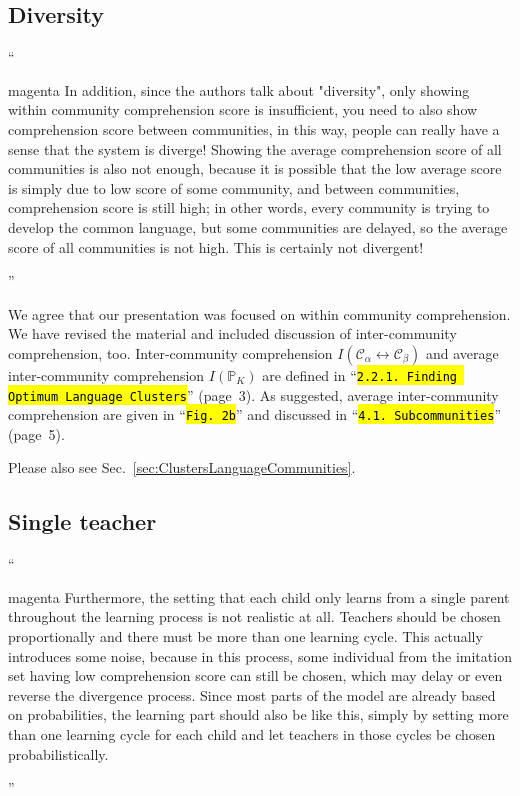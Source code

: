 \documentclass[10.5pt]{amsart}
\newcommand{\refsec}[1]{Sec.~\ref{#1}}
\newcommand{\hbColorReviewer}{magenta}
\newcommand{\hbColorManuscript}{violet}
\newenvironment{hbReviewer}
	{\list{}{\leftmargin=2cm\rightmargin=1cm}\item[]``\begin{footnotesize}
	\begin{color}{\hbColorReviewer}}	
	{\end{color}\end{footnotesize}''\endlist}
\newcommand{\hbMRef}[1]{``\texttt{{\color{\hbColorManuscript}\hl{#1}}}''}
\newcommand{\hbMRefP}[2]{``\texttt{{\color{\hbColorManuscript}\hl{#1}}}''  (page~#2)}
\newcommand{\hbMreffig}[1]{\hbMRef{Fig.~#1}}
\newcommand{\hbMOptimumLanguageClusters}{\hbMRefP{2.2.1. Finding Optimum Language Clusters}{3}}
\newcommand{\hbMSubcommunities}{\hbMRefP{4.1. Subcommunities}{5}}
\newcommand{\hbSet}[1]{\mathcal{#1}}
\newcommand{\hbIntCLS}[2]{I(#1 \leftrightarrow #2)}
\newcommand{\hbPartition}[1]{\mathbb{#1}} %
\begin{document}
\subsection{Diversity}
\label{sec:diversity}
\begin{hbReviewer}
	In addition, since the authors talk about "diversity", 
	only showing within community comprehension score is insufficient, 
	you need to also show comprehension score between communities, 
	in this way, people can really have a sense that the system is diverge! 
	Showing the average comprehension score of all communities is also 
	not enough, 
	because it is possible that the low average score is simply 
	due to low score of some community, 
	and between communities, comprehension score is still high; 
	in other words, every community is trying to develop the common language, 
	but some communities are delayed, 
	so the average score of all communities is not high. 
	This is certainly not divergent! 
\end{hbReviewer}

We agree that our presentation was focused on within community comprehension.
We have revised the material and 
included discussion of inter-community comprehension, too.
Inter-community comprehension 
$\hbIntCLS{\hbSet{C}_{\alpha}}{\hbSet{C}_{\beta}}$ 
and 
average inter-community comprehension 
$I({\hbPartition{P}_{K}})$
are defined in \hbMOptimumLanguageClusters.
As suggested, 
average inter-community comprehension are given in \hbMreffig{2b} and discussed in \hbMSubcommunities.

Please also see \refsec{sec:ClustersLanguageCommunities}.






\subsection{Single teacher}
\label{sec:singleTeacher}
\begin{hbReviewer}
	Furthermore, the setting that each child only learns from a single parent 
	throughout the learning process is not realistic at all. 
	Teachers should be chosen proportionally 
	and there must be more than one learning cycle. 
	This actually introduces some noise, 
	because in this process, some individual from the imitation set 
	having low comprehension score can still be chosen, 
	which may delay or even reverse the divergence process. 
	Since most parts of the model are already based on probabilities, 
	the learning part should also be like this, 
	simply by setting more than one learning cycle for each child 
	and let teachers in those cycles be chosen probabilistically. 
\end{hbReviewer}
\end{document}
